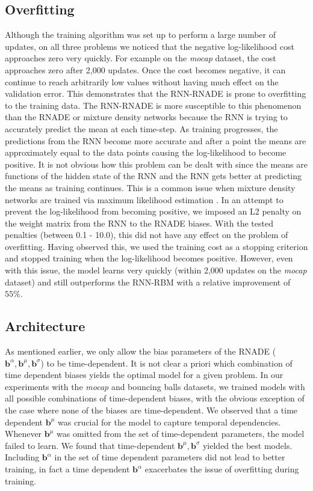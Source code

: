 \documentclass{article} %
\begin{document}
\subsection{Overfitting}
Although the training algorithm was set up to perform a large number of updates, on all three problems we noticed that the negative log-likelihood cost approaches zero very quickly. For example on the \textit{mocap} dataset, the cost approaches zero after 2,000 updates. Once the cost becomes negative, it can continue to reach arbitrarily low values without having much effect on the validation error. This demonstrates that the RNN-RNADE is prone to overfitting to the training data. The RNN-RNADE is more susceptible to this phenomenon than the RNADE or mixture density networks because the RNN is trying to accurately predict the mean at each time-step. As training progresses, the predictions from the RNN become more accurate and after a point the means are approximately equal to the data points causing the log-likelihood to become positive. It is not obvious how this problem can be dealt with since the means are functions of the hidden state of the RNN and the RNN gets better at predicting the means as training continues. This is a common issue when mixture density networks are trained via maximum likelihood estimation \cite{bishop2006pattern}. In an attempt to prevent the log-likelihood from becoming positive, we imposed an L2 penalty on the weight matrix from the RNN to the RNADE biases. With the tested penalties (between 0.1 - 10.0), this did not have any effect on the problem of overfitting. Having observed this, we used the training cost as a stopping criterion and stopped training when the log-likelihood becomes positive. However, even with this issue, the model learns very quickly (within 2,000 updates on the \textit{mocap} dataset) and still outperforms the RNN-RBM with a relative improvement of $55\%$. 

\subsection{Architecture}

As mentioned earlier, we only allow the bias parameters of the RNADE ($\mathbf{b}^{\alpha},\mathbf{b}^{\mu},\mathbf{b}^{\sigma}$) to be time-dependent. It is not clear a priori which combination of time dependent biases yields the optimal model for a given problem. In our experiments with the \textit{mocap} and bouncing balls datasets, we trained models with all possible combinations of time-dependent biases, with the obvious exception of the case where none of the biases are time-dependent. We observed that a time dependent $\mathbf{b}^{\mu}$ was crucial for the model to capture temporal dependencies. Whenever $\mathbf{b}^{\mu}$ was omitted from the set of time-dependent parameters, the model failed to learn. We found that time-dependent $\mathbf{b}^{\mu},\mathbf{b}^{\sigma}$ yielded the best models. Including $\mathbf{b}^{\alpha}$ in the set of time dependent parameters did not lead to better training, in fact a time dependent $\mathbf{b}^{\alpha}$ exacerbates the issue of overfitting during training. 
\end{document}
